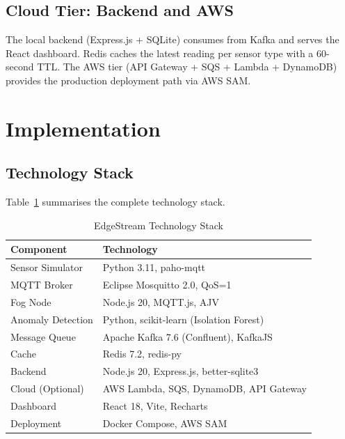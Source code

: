 \documentclass[conference]{IEEEtran}
\begin{document}
\subsection{Cloud Tier: Backend and AWS}

The local backend (Express.js + SQLite) consumes from Kafka and serves the React dashboard. Redis caches the latest reading per sensor type with a 60-second TTL. The AWS tier (API Gateway + SQS + Lambda + DynamoDB) provides the production deployment path via AWS SAM.

\section{Implementation}
\label{sec:implementation}

\subsection{Technology Stack}

Table~\ref{tab:stack} summarises the complete technology stack.

\begin{table}[H]
\caption{EdgeStream Technology Stack}
\label{tab:stack}
\begin{tabularx}{\columnwidth}{lX}
\toprule
\textbf{Component} & \textbf{Technology} \\
\midrule
Sensor Simulator   & Python 3.11, paho-mqtt \\
MQTT Broker        & Eclipse Mosquitto 2.0, QoS=1 \\
Fog Node           & Node.js 20, MQTT.js, AJV \\
Anomaly Detection  & Python, scikit-learn (Isolation Forest) \\
Message Queue      & Apache Kafka 7.6 (Confluent), KafkaJS \\
Cache              & Redis 7.2, redis-py \\
Backend            & Node.js 20, Express.js, better-sqlite3 \\
Cloud (Optional)   & AWS Lambda, SQS, DynamoDB, API Gateway \\
Dashboard          & React 18, Vite, Recharts \\
Deployment         & Docker Compose, AWS SAM \\
\bottomrule
\end{tabularx}
\end{table}
\end{document}
